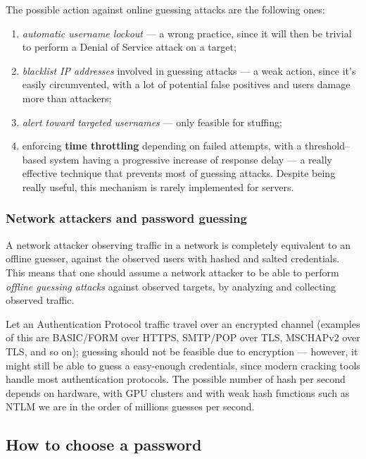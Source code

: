 \documentclass[10pt]{\classname}
\begin{document}
The possible action against online guessing attacks are the following ones:
\begin{enumerate}
    \item \emph{automatic username lockout} --- a wrong practice, since it will
        then be trivial to perform a Denial of Service attack on a target;
    \item \emph{blacklist IP addresses} involved in guessing attacks --- a weak
        action, since it's easily circumvented, with a lot of potential false
        positives and users damage more than attackers;
    \item \emph{alert toward targeted usernames} --- only feasible for stuffing;
    \item enforcing \textbf{time throttling} depending on failed attempts, with
        a threshold\---based system having a progressive increase of response
        delay --- a really effective technique that prevents most of guessing
        attacks. Despite being really useful, this mechanism is rarely
        implemented for servers.
\end{enumerate}

\subsubsection{Network attackers and password guessing}

A network attacker observing traffic in a network is completely equivalent to
an offline guesser, against the observed users with hashed and salted
credentials. This means that one should assume a network attacker to be able to
perform \emph{offline guessing attacks} against observed targets, by analyzing
and collecting observed traffic.

Let an Authentication Protocol traffic travel over an encrypted channel
(examples of this are BASIC/FORM over HTTPS, SMTP/POP over TLS, MSCHAPv2 over
TLS, and so on); guessing should not be feasible due to encryption --- however,
it might still be able to guess a easy\--enough credentials, since modern
cracking tools handle most authentication protocols. The possible number of
hash per second depends on hardware, with GPU clusters and with weak hash
functions such as NTLM we are in the order of millions guesses per second.

\subsection{How to choose a password}
\end{document}
